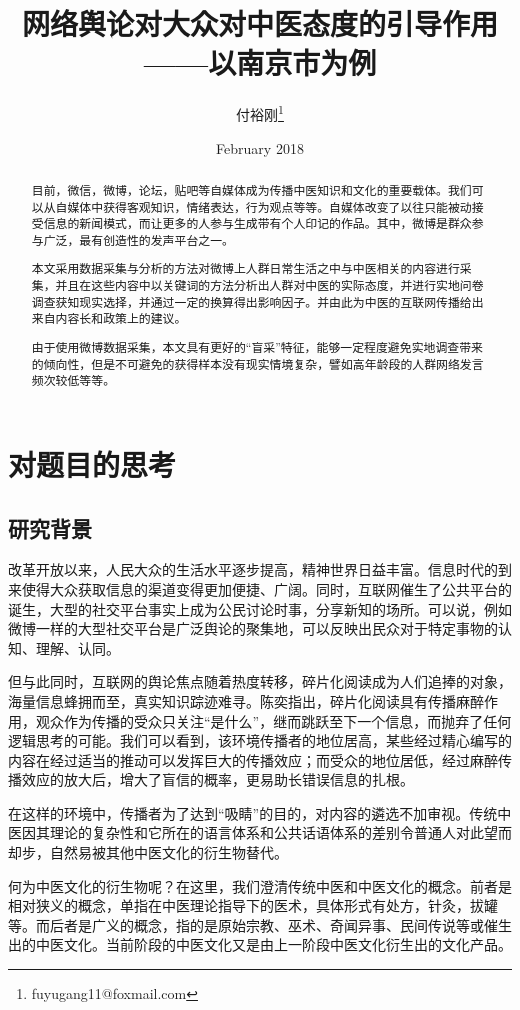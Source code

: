 \documentclass{ctexart}
\date{February 2018}
\title{网络舆论对大众对中医态度的引导作用——以南京市为例}
\author{{付裕刚\thanks{fuyugang11@foxmail.com}}}
\begin{document}
\maketitle
{}
\begin{abstract}
	目前，微信，微博，论坛，贴吧等自媒体成为传播中医知识和文化的重要载体。我们可以从自媒体中获得客观知识，情绪表达，行为观点等等。自媒体改变了以往只能被动接受信息的新闻模式，而让更多的人参与生成带有个人印记的作品。其中，微博是群众参与广泛，最有创造性的发声平台之一。
	
	本文采用数据采集与分析的方法对微博上人群日常生活之中与中医相关的内容进行采集，并且在这些内容中以关键词的方法分析出人群对中医的实际态度，并进行实地问卷调查获知现实选择，并通过一定的换算得出影响因子。并由此为中医的互联网传播给出来自内容长和政策上的建议。
	
	由于使用微博数据采集，本文具有更好的“盲采”特征，能够一定程度避免实地调查带来的倾向性，但是不可避免的获得样本没有现实情境复杂，譬如高年龄段的人群网络发言频次较低等等。
\end{abstract}
\tableofcontents
\newpage
{}

\section{对题目的思考}
\subsection{研究背景}
改革开放以来，人民大众的生活水平逐步提高，精神世界日益丰富。信息时代的到来使得大众获取信息的渠道变得更加便捷、广阔。同时，互联网催生了公共平台的诞生，大型的社交平台事实上成为公民讨论时事，分享新知的场所。可以说，例如微博一样的大型社交平台是广泛舆论的聚集地，可以反映出民众对于特定事物的认知、理解、认同。

但与此同时，互联网的舆论焦点随着热度转移，碎片化阅读成为人们追捧的对象，海量信息蜂拥而至，真实知识踪迹难寻。陈奕指出，碎片化阅读具有传播麻醉作用，观众作为传播的受众只关注“是什么”，继而跳跃至下一个信息，而抛弃了任何逻辑思考的可能。我们可以看到，该环境传播者的地位居高，某些经过精心编写的内容在经过适当的推动可以发挥巨大的传播效应；而受众的地位居低，经过麻醉传播效应\cite{cy2014}的放大后，增大了盲信的概率，更易助长错误信息的扎根。

在这样的环境中，传播者为了达到“吸睛”的目的，对内容的遴选不加审视。传统中医因其理论的复杂性和它所在的语言体系和公共话语体系的差别令普通人对此望而却步，自然易被其他中医文化的衍生物替代。

何为中医文化的衍生物呢？在这里，我们澄清传统中医和中医文化的概念。前者是相对狭义的概念，单指在中医理论指导下的医术，具体形式有处方，针灸，拔罐等。而后者是广义的概念，指的是原始宗教、巫术、奇闻异事、民间传说等或催生出的中医文化。当前阶段的中医文化又是由上一阶段中医文化衍生出的文化产品。
\end{document}
